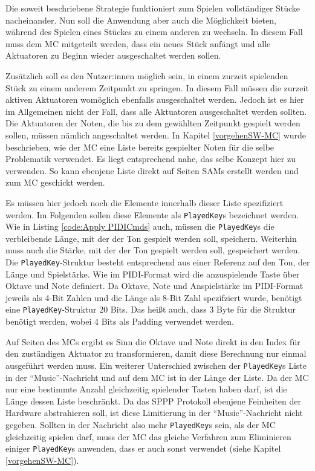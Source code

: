 Die soweit beschriebene Strategie funktioniert zum Spielen vollständiger Stücke nacheinander.
Nun soll die Anwendung aber auch die Möglichkeit bieten, während des Spielen eines Stückes zu einem anderen zu wechseln.
In diesem Fall muss dem \ac{MC} mitgeteilt werden, dass ein neues Stück anfängt und alle Aktuatoren zu Beginn wieder ausgeschaltet werden sollen.

Zusätzlich soll es den Nutzer:innen möglich sein, in einem zurzeit spielenden Stück zu einem anderem Zeitpunkt zu springen.
In diesem Fall müssen die zurzeit aktiven Aktuatoren womöglich ebenfalls ausgeschaltet werden.
Jedoch ist es hier im Allgemeinen nicht der Fall, dass alle Aktuatoren ausgeschaltet werden sollten.
Die Aktuatoren der Noten, die bis zu dem gewählten Zeitpunkt gespielt werden sollen, müssen nämlich angeschaltet werden.
In Kapitel \ref{vorgehenSW-MC} wurde beschrieben, wie der \ac{MC} eine Liste bereits gespielter Noten für die selbe Problematik verwendet.
Es liegt entsprechend nahe, das selbe Konzept hier zu verwenden.
So kann ebenjene Liste direkt auf Seiten \ac{SAM}s erstellt werden und zum \ac{MC} geschickt werden.

Es müssen hier jedoch noch die Elemente innerhalb dieser Liste spezifiziert werden.
Im Folgenden sollen diese Elemente als \lstinline|PlayedKey|s bezeichnet werden.
Wie in Listing \ref{code:Apply PIDICmds} auch, müssen die \lstinline|PlayedKey|s die verbleibende Länge, mit der der Ton gespielt werden soll, speichern.
Weiterhin muss auch die Stärke, mit der der Ton gespielt werden soll, gespeichert werden.
Die \lstinline|PlayedKey|-Struktur besteht entsprechend aus einer Referenz auf den Ton, der Länge und Spielstärke.
Wie im \ac{PIDI}-Format wird die anzuspielende Taste über Oktave und Note definiert.
Da Oktave, Note und Anspielstärke im \ac{PIDI}-Format jeweils als 4-Bit Zahlen und die Länge als 8-Bit Zahl spezifziert wurde, benötigt eine \lstinline|PlayedKey|-Struktur 20 Bits.
Das heißt auch, dass 3 Byte für die Struktur benötigt werden, wobei 4 Bits als Padding verwendet werden.

Auf Seiten des \ac{MC}s ergibt es Sinn die Oktave und Note direkt in den Index für den zuständigen Aktuator zu transformieren, damit diese Berechnung nur einmal ausgeführt werden muss.
Ein weiterer Unterschied zwischen der \lstinline|PlayedKey|s Liste in der \enquote{Music}-Nachricht und auf dem \ac{MC} ist in der Länge der Liste.
Da der \ac{MC} nur eine bestimmte Anzahl gleichzeitig spielender Tasten haben darf, ist die Länge dessen Liste beschränkt.
Da das \ac{SPPP} Protokoll ebenjene Feinheiten der Hardware abstrahieren soll, ist diese Limitierung in der \enquote{Music}-Nachricht nicht gegeben.
Sollten in der Nachricht also mehr \lstinline|PlayedKey|s sein, als der \ac{MC} gleichzeitig spielen darf, muss der \ac{MC} das gleiche Verfahren zum Eliminieren einiger \lstinline|PlayedKey|s anwenden, dass er auch sonst verwendet (siehe Kapitel \ref{vorgehenSW-MC}).

